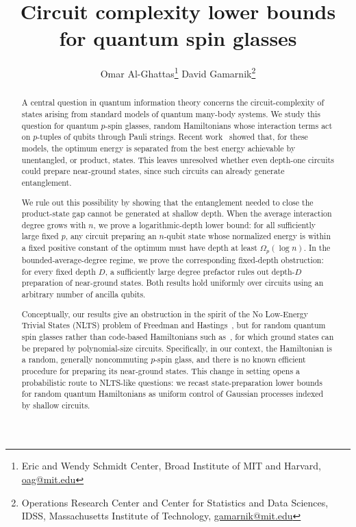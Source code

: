 \documentclass[12pt]{article}
\begin{document}
\title{Circuit complexity lower bounds for quantum spin glasses}


\author{
Omar Al-Ghattas\thanks{Eric and Wendy Schmidt Center, Broad Institute of MIT and Harvard, \href{mailto:oag@mit.edu}{oag@mit.edu}}
\qquad
David Gamarnik\thanks{Operations Research Center and Center for Statistics and Data Sciences, IDSS, Massachusetts Institute of Technology,
\href{mailto:gamarnik@mit.edu}{gamarnik@mit.edu}
}}


\maketitle

\begin{abstract}
A central question in quantum information theory concerns the circuit-complexity of states arising from standard models of quantum many-body systems. We study this question for quantum \(p\)-spin glasses, random Hamiltonians whose interaction terms act on \(p\)-tuples of qubits through Pauli strings. Recent work~\cite{anschuetz2025bounds} showed that, for these models, the optimum energy is separated from the best energy achievable by unentangled, or product, states. This leaves unresolved whether even depth-one circuits could prepare near-ground states, since such circuits can already generate entanglement.

We rule out this possibility by showing that the entanglement needed to close the product-state gap cannot be generated at shallow depth. When the average interaction degree grows with $n$, we prove a logarithmic-depth lower bound: for all sufficiently large fixed $p$, any circuit preparing an $n$-qubit state whose normalized energy is within a fixed positive constant of the optimum must have depth at least $\Omega_p(\log n)$. In the bounded-average-degree regime, we prove the corresponding fixed-depth obstruction: for every fixed depth $D$, a sufficiently large degree prefactor rules out depth-$D$ preparation of near-ground states. Both results hold uniformly over circuits using an arbitrary number of ancilla qubits.


Conceptually, our results give an obstruction in the spirit of the No Low-Energy Trivial States (NLTS) problem of Freedman and Hastings~\cite{freedman2014quantum}, but for random quantum spin glasses rather than code-based Hamiltonians such as~\cite{anshu2023nlts}, for which ground states can be prepared by polynomial-size circuits. Specifically, in our context,
the Hamiltonian is a random, generally noncommuting $p$-spin glass, and there is no known efficient procedure for preparing its near-ground states. This change in setting opens a probabilistic route to NLTS-like questions: we recast state-preparation lower bounds for random quantum Hamiltonians as uniform control of Gaussian processes indexed by shallow circuits.


\vspace{.1in}



\end{abstract}
\end{document}
